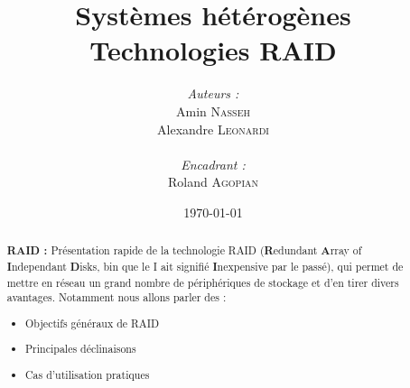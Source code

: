 \documentclass[a4paper,11pt]{article}
\title{
  \textbf{Systèmes hétérogènes}\\
  Technologies RAID
}
\author{
\begin{minipage}{0.4\textwidth}
	\begin{flushleft} \large
		\emph{Auteurs :}\\
                Amin \textsc{Nasseh}\\
		Alexandre \textsc{Leonardi}\\
	\end{flushleft}
\end{minipage}
\begin{minipage}{0.4\textwidth}
	\begin{flushright} \large
		\emph{Encadrant :} \\
		Roland \textsc{Agopian}\\
	\end{flushright}
\end{minipage}
}
\date{\today}
\begin{document}
\maketitle
\thispagestyle{empty}
\begin{abstract}
\textbf{RAID :} Présentation rapide de la technologie RAID (\textbf{R}edundant \textbf{A}rray of \textbf{I}ndependant \textbf{D}isks, bin que le I ait signifié \textbf{I}nexpensive par le passé), qui permet de mettre en réseau un grand nombre de périphériques de stockage et d'en tirer divers avantages. Notamment nous allons parler des :
\begin{itemize}
	\item Objectifs généraux de RAID
    \item Principales déclinaisons 
    \item Cas d'utilisation pratiques
\end{itemize}
\end{abstract}
\pagebreak

\tableofcontents
\pagebreak



\pagebreak

\pagebreak
\nocite{*}

\end{document}
